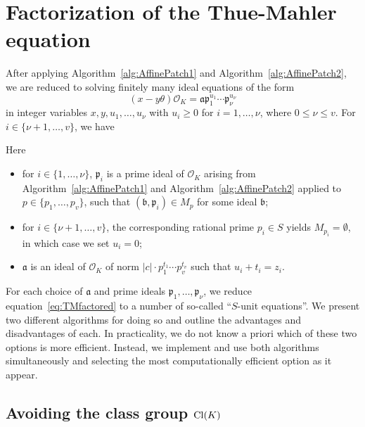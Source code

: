 \section{Factorization of the Thue-Mahler equation}
\label{sec:FactorizationTM}

After applying Algorithm~\ref{alg:AffinePatch1} and Algorithm~\ref{alg:AffinePatch2}, we are reduced to solving finitely many ideal equations of the form
\begin{equation}\label{eq:TMfactored}
(x-y\theta)\mathcal{O}_K=\mathfrak{a} \mathfrak{p}_1^{u_1}\cdots \mathfrak{p}_{\nu}^{u_{\nu}}
\end{equation}
in integer variables $x,y,u_1, \dots, u_{\nu}$ with $u_i \geq 0$ for $i = 1, \dots, \nu$, where ${0 \leq \nu \leq v}$. For $i \in \{\nu+1, \dots, v\}$, we have 

Here
\begin{itemize}
\item for $i \in \{1, \dots, \nu\}$, $\mathfrak{p}_i$ is a prime ideal of $\mathcal{O}_K$ arising from Algorithm~\ref{alg:AffinePatch1} and Algorithm~\ref{alg:AffinePatch2} applied to $p \in \{p_1, \dots, p_v\}$, such that $(\mathfrak{b}, \mathfrak{p}_i) \in M_p$ for some ideal $\mathfrak{b}$;
\item for $i \in \{\nu+1, \dots, v\}$, the corresponding rational prime $p_i \in S$ yields $M_{p_i} = \emptyset$, in which case we set $u_i = 0$;
\item $\mathfrak{a}$ is an ideal of $\mathcal{O}_K$ of norm $|c|\cdot p_1^{t_1} \cdots p_v^{t_v}$ such that
$u_i + t_i =  z_i$. 
\end{itemize}

For each choice of $\mathfrak{a}$ and prime ideals $\mathfrak{p}_1, \dots, \mathfrak{p}_{\nu}$, we reduce equation~\eqref{eq:TMfactored} to a number of so-called ``$S$-unit equations''. We present two different algorithms for doing so and outline the advantages and disadvantages of each. In practicality, we do not know a priori which of these two options is more efficient. Instead, we implement and use both algorithms simultaneously and selecting the most computationally efficient option as it appear. 


\subsection{Avoiding the class group $\operatorname{Cl}(K)$}
\label{subsec:FactorizationTMwithoutOK}

